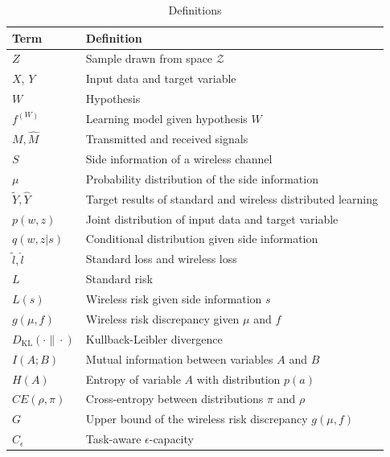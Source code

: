 \documentclass[lettersize,journal]{IEEEtran}
\theoremstyle{definition}
\theoremstyle{plain}
\begin{document}
\begin{table}[htbp]
  \caption{Definitions}
  \label{tab:definitions}
  \centering
  \begin{tabular}{| m{}<{\centering} | m{}<{\centering} |}
    \hline
    Term & Definition \\ \hline
    $Z$ & Sample drawn from space $\mathcal{Z}$ \\ \hline
    $X$, $Y$ & Input data and target variable \\ \hline
    $W$ & Hypothesis \\ \hline
    $f^{(W)}$ & Learning model given hypothesis $W$ \\ \hline
    $M,\hat{M}$ & Transmitted and received signals \\ \hline
    $S$ & Side information of a wireless channel \\ \hline
    $\mu$ & Probability distribution of the side information \\ \hline
    $\tilde{Y},\hat{Y}$ & Target results of standard and wireless distributed learning\\ \hline
    $p(w,z)$ & Joint distribution of input data and target variable \\ \hline
    $q(w,z|s)$ & Conditional distribution given side information \\ \hline
    $\tilde{l},\hat{l}$ & Standard loss and wireless loss \\ \hline
    $L$ & Standard risk \\ \hline
    $L(s)$ & Wireless risk given side information $s$ \\ \hline
    $g(\mu,f)$ & Wireless risk discrepancy given $\mu$ and $f$ \\ \hline
    $D_{\text{KL}}(\cdot\|\cdot)$ & Kullback-Leibler divergence \\ \hline
    $I(A;B)$ & Mutual information between variables $A$ and $B$ \\ \hline
    $H(A)$ & Entropy of variable $A$ with distribution $p(a)$ \\ \hline
    $CE(\rho,\pi)$ & Cross-entropy between distributions $\pi$ and $\rho$ \\ \hline
    $G$ & Upper bound of the wireless risk discrepancy $g(\mu,f)$ \\ \hline
    $C_\epsilon$ & Task-aware $\epsilon$-capacity \\ \hline
  \end{tabular}
\end{table}
\end{document}
